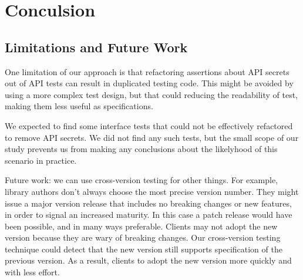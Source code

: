 \section{Conculsion} 

\subsection{Limitations and Future Work}
One limitation of our approach is that refactoring assertions about
API secrets out of API tests can result in duplicated testing
code. This might be avoided by using a more complex test design, but
that could reducing the readability of test, making them less useful
as specifications.

We expected to find some interface tests that could not be effectively
refactored to remove API secrets. We did not find any such tests, but
the small scope of our study prevents us from making any conclusions
about the likelyhood of this scenario in practice. 

Future work: we can use cross-version testing for other things. For
example, library authors don't always choose the most precise version
number. They might issue a major version release that includes no
breaking changes or new features, in order to signal an increased
maturity. In this case a patch release would have been possible, and
in many ways preferable. Clients may not adopt the new version because
they are wary of breaking changes. Our cross-version testing technique
could detect that the new version still supports specification of the
previous version. As a result, clients to adopt the new version more
quickly and with less effort.
